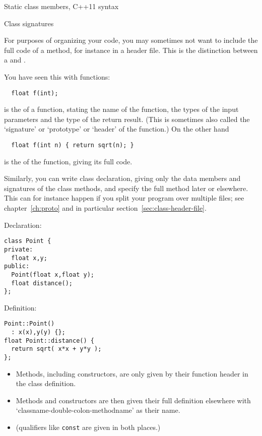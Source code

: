 \begin{block}{Static class members, C++11 syntax}
  \label{sl:static-member11}
  \lstset{style=snippetcode}
\end{block}

 {Class signatures}
\label{sec:class-decl-defn}

For purposes of organizing your code,
you may sometimes not want to include the full code of a method,
for instance in a header file.
This is the distinction between a 
and .

You have seen this with functions:
\begin{lstlisting}
  float f(int);
\end{lstlisting}
is the  of a function,
stating the name of the function, the types of the input parameters
and the type of the return result.
(This is sometimes also called the `signature' or `prototype' or `header'
of the function.)
On the other hand
\begin{lstlisting}
  float f(int n) { return sqrt(n); }
\end{lstlisting}
is the  of the function, giving its full code.

Similarly, you can write class declaration, giving only the
data members and signatures of the class methods,
and specify the full method later or elsewhere.
This can for instance happen if you split your program over multiple files;
see chapter~\ref{ch:proto} and in particular section~\ref{sec:class-header-file}.

\begin{multicols}{2}
  Declaration:
\begin{lstlisting}
class Point {
private:
  float x,y;
public:
  Point(float x,float y);
  float distance();
};
\end{lstlisting}
\columnbreak
Definition:
\begin{lstlisting}
Point::Point()
  : x(x),y(y) {};
float Point::distance() {
  return sqrt( x*x + y*y );
};
\end{lstlisting}
\end{multicols}
\begin{itemize}
\item Methods, including constructors, are only given by their function header
  in the class definition.
\item Methods and constructors are then given their full definition elsewhere
  with
  `classname-double-colon-methodname' as their name.
\item (qualifiers like \lstinline{const} are given in both places.)
\end{itemize}

